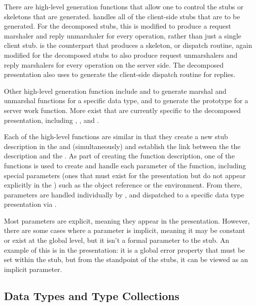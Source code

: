 There are high-level generation functions that allow one to control the stubs
or skeletons that are generated.   handles all of
the client-side stubs that are to be generated.  For the decomposed stubs, this
is modified to produce a request marshaler and reply unmarshaler for every
operation, rather than just a single client stub.   is
the counterpart that produces a skeleton, or dispatch routine, again modified
for the decomposed stubs to also produce request unmarshalers and reply
marshalers for every operation on the server side.  The decomposed presentation
also uses  to generate the client-side dispatch routine
for replies.

Other high-level generation function include  and
 to generate marshal and unmarshal functions
for a specific data type, and  to generate the
prototype for a server work function.  More exist that are currently specific
to the decomposed presentation, including ,
, and .

Each of the high-level functions are similar in that they create a new stub
description in the \CAST{} and \PRESC{} (simultaneously) and establish the link
between the the description and the \MINT{}\@.  As part of creating the
function description, one of the  functions is
used to create and handle each parameter of the function, including special
parameters (ones that must exist for the presentation but do not appear
explicitly in the \IDL{}) such as the object reference or the \CORBA{}
environment.  From there, parameters are handled individually by
, and dispatched to a specific data type presentation
via .

Most parameters are explicit, meaning they appear in the presentation.
However, there are some cases where a parameter is implicit, meaning it may be
constant or exist at the global level, but it isn't a formal parameter to the
stub.  An example of this is  in the \ONCRPC{} presentation:
it is a global error property that must be set within the stub, but from the
standpoint of the stubs, it can be viewed as an implicit parameter.


\subsection{Data Types and Type Collections}
\label{subsec:PG:Data Types and Type Collections}

